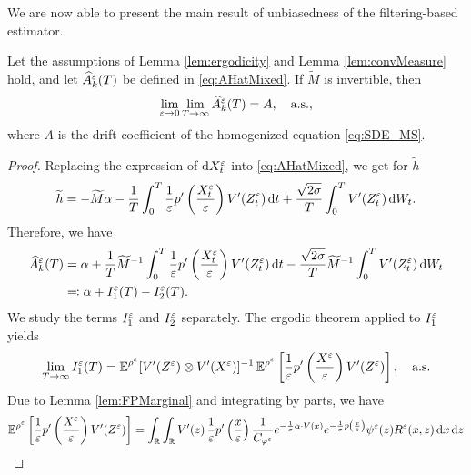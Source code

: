 \documentclass[10pt]{article}
\begin{document}
We are now able to present the main result of unbiasedness of the filtering-based estimator.
\begin{theorem}\label{thm:mainTheorem} Let the assumptions of Lemma \ref{lem:ergodicity} and Lemma \ref{lem:convMeasure} hold, and let $\widehat A^\varepsilon_k(T)$ be defined in \eqref{eq:AHatMixed}. If $\widetilde M$ is invertible, then
	\begin{equation}
	\lim_{\varepsilon \to 0} \lim_{T \to \infty} \widehat A_k^\varepsilon(T) = A, \quad \text{a.s.},
	\end{equation}
	where $A$ is the drift coefficient of the homogenized equation \eqref{eq:SDE_MS}.
\end{theorem}

\begin{proof} Replacing the expression of $\mathrm{d} X^\varepsilon_t$ into \eqref{eq:AHatMixed}, we get for $\widetilde h$
\begin{equation}\label{Ahat_decomposition}
\widetilde h = -\widetilde M \alpha - \frac{1}{T} \int_0^T \frac{1}{\varepsilon} p' \left ( \frac{X^\varepsilon_t}{\varepsilon} \right ) V'(Z^\varepsilon_t) \,\mathrm{d} t + \frac{\sqrt{2\sigma}}{T} \int_0^T V'(Z^\varepsilon_t) \,\mathrm{d} W_t.
\end{equation}
Therefore, we have
\begin{equation}
\begin{aligned}
	\widehat A^\varepsilon_k(T) &= \alpha + \frac{1}{T} \widetilde M^{-1} \int_0^T \frac{1}{\varepsilon} p' \left ( \frac{X^\varepsilon_t}{\varepsilon} \right ) V'(Z^\varepsilon_t) \,\mathrm{d} t - \frac{\sqrt{2\sigma}}{T}  \widetilde M^{-1} \int_0^T V'(Z^\varepsilon_t) \,\mathrm{d} W_t\\
	&\eqqcolon \alpha + I_1^\varepsilon(T) - I_2^\varepsilon(T).
\end{aligned}
\end{equation}
We study the terms $I_1^\varepsilon$ and $I_2^\varepsilon$ separately. The ergodic theorem applied to $I_1^\varepsilon$ yields
\begin{equation}\label{limit_estimator}
\lim_{T \to \infty} I_1^\varepsilon(T) = \operatorname{\mathbb{E}}^{\rho^\varepsilon} [V'(Z^\varepsilon) \otimes V'(X^\varepsilon)]^{-1} \operatorname{\mathbb{E}}^{\rho^\varepsilon} \left [ \frac{1}{\varepsilon} p' \left ( \frac{X^\varepsilon}{\varepsilon} \right ) V'(Z^\varepsilon) \right ], \quad \text{a.s.}
\end{equation}
Due to Lemma \ref{lem:FPMarginal} and integrating by parts, we have
\begin{equation}
\begin{aligned}
	\E^{\rho^\epl} \left [ \frac{1}{\epl} p' \left ( \frac{X^\epl}{\epl} \right ) V'(Z^\epl) \right ] &= \int_{\R} \int_{\R} V'(z) \, \frac1\epl p' \left ( \frac{x}\epl \right ) \frac{1}{C_{\phi^\epl}} e^{- \frac{1}{\sigma} \alpha \cdot V(x)} e^{ - \frac{1}{\sigma} p \left ( \frac{x}\epl \right)} \psi^\epl(z) R^\epl(x,z) \dd x \dd z \\

\end{aligned}
\end{equation}
\end{proof}
\end{document}
